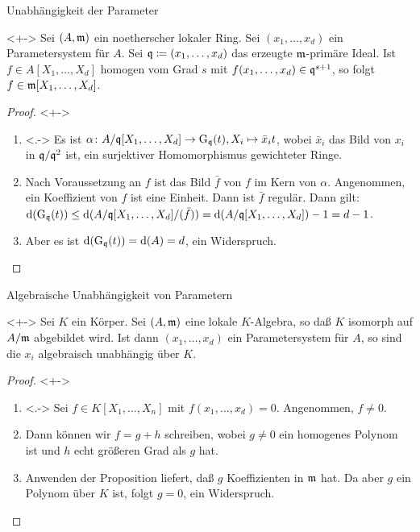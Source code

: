 \begin{frame}{Unabhängigkeit der Parameter}
	\begin{proposition}<+->
		Sei \((A, \mathfrak{m})\) ein noetherscher lokaler Ring. Sei \((x_1, \dotsc, x_d)\) ein Parametersystem für \(A\).
		Sei \(\mathfrak{q} \coloneqq (x_1, \dotsc, x_d)\) das erzeugte \(\mathfrak{m}\)-primäre Ideal.
		Ist \(f \in A[X_1, \dotsc, X_d]\) homogen vom Grad \(s\) mit \(f(x_1, \dotsc, x_d) \in \mathfrak{q}^{s + 1}\), so folgt
		\(f \in \mathfrak{m}[X_1, \dotsc, X_d]\).
	\end{proposition}
	\begin{proof}<+->
		\begin{enumerate}[<+->]
		\item<.->
			Es ist \(\alpha\colon A/\mathfrak{q}[X_1, \dotsc, X_d] \to \operatorname{G}_{\mathfrak{q}}(t), X_i \mapsto \bar x_i t\),
			wobei \(\bar x_i\) das Bild von \(x_i\) in \(\mathfrak{q}/\mathfrak{q}^2\) ist, ein surjektiver 
			Homomorphismus gewichteter Ringe. 
		\item
			Nach Voraussetzung an \(f\) ist das Bild \(\bar f\) von \(f\) im Kern von \(\alpha\). Angenommen, ein 
			Koeffizient von
			\(f\) ist eine Einheit. Dann ist \(\bar f\) regulär. Dann gilt:
			\(\operatorname{d}(\operatorname{G}_{\mathfrak{q}}(t)) \leq \operatorname{d}(A/\mathfrak{q}[X_1, \dotsc, X_d]/(\bar f))
			= \operatorname{d}(A/\mathfrak{q}[X_1, \dotsc, X_d]) - 1 = d - 1\).
		 \item
		 	Aber es ist \(\operatorname{d}(\operatorname{G}_{\mathfrak{q}}(t)) = \operatorname{d}(A) = d\), ein Widerspruch.
			\qedhere
		\end{enumerate}
	\end{proof}
\end{frame}

\begin{frame}{Algebraische Unabhängigkeit von Parametern}
	\begin{corollary}<+->
		Sei \(K\) ein Körper. Sei \((A, \mathfrak{m})\) eine lokale \(K\)-Algebra, so daß \(K\) isomorph auf \(A/\mathfrak{m}\)
		abgebildet wird. Ist dann \((x_1, \dotsc, x_d)\) ein Parametersystem für \(A\), so sind die \(x_i\) algebraisch
		unabhängig über \(K\).
	\end{corollary}
	\begin{proof}<+->
		\begin{enumerate}[<+->]
		\item<.->
			Sei \(f \in K[X_1, \dotsc, X_n]\) mit \(f(x_1, \dotsc, x_d) = 0\). Angenommen, \(f \neq 0\).
		\item
			Dann können wir \(f = g + h\) schreiben, wobei \(g \neq 0\) ein homogenes Polynom ist und \(h\) echt größeren
			Grad als \(g\) hat.
		\item
			Anwenden der Proposition liefert, daß \(g\) Koeffizienten in \(\mathfrak{m}\) hat.
			Da aber \(g\) ein Polynom über \(K\) ist, folgt \(g = 0\), ein Widerspruch.
			\qedhere
		\end{enumerate}
	\end{proof}
\end{frame}

